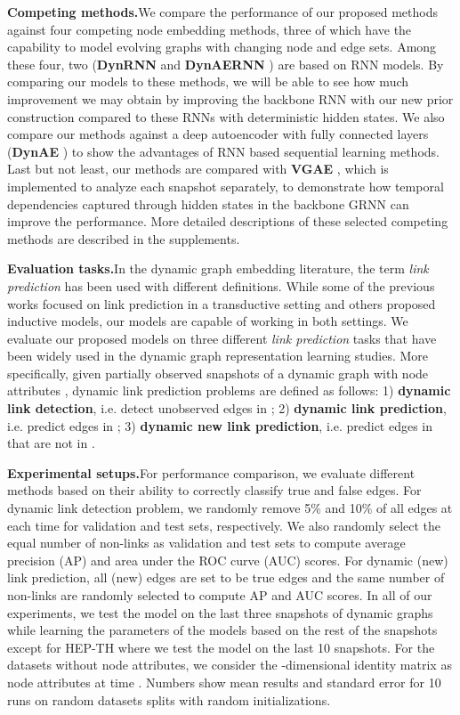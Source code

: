 \documentclass{article}
\begin{document}
\noindent\textbf{Competing methods.}\quad We compare the performance of our proposed methods against four competing node embedding methods, three of which have the capability to model evolving graphs with changing node and edge sets. 
Among these four, two (\textbf{DynRNN} and \textbf{DynAERNN} \citep{goyal2018dyngraph2vec}) are based on RNN models.
By comparing our models to these methods, we will be able to see how much improvement we may obtain by improving the backbone RNN with our new prior construction compared to these RNNs with deterministic hidden states. We also compare our methods against a deep autoencoder
with fully connected layers (\textbf{DynAE} \cite{goyal2018dyngraph2vec}) to show the advantages of RNN based sequential learning methods. Last but not least, our methods are compared with \textbf{VGAE} \cite{kipf2016variational}, which is implemented to analyze each snapshot separately, to demonstrate how temporal dependencies captured through hidden states in the backbone GRNN can improve the performance.
More detailed descriptions of these selected competing methods are described in the supplements.

\noindent\textbf{Evaluation tasks.}\quad In the dynamic graph embedding literature, the term \textit{link prediction} has been used with different definitions. While some of the previous works focused on link prediction in a transductive setting and others proposed inductive models, our models are capable of working in both settings. We evaluate our proposed models on three different \textit{link prediction} tasks that have been widely used in the dynamic graph representation learning studies. 
More specifically, given partially observed snapshots of a dynamic graph  with node attributes , dynamic link prediction problems are defined as follows: 1) \textbf{dynamic link detection}, i.e. detect unobserved edges in ; 2) \textbf{dynamic link prediction}, i.e. predict edges in ; 3) \textbf{dynamic new link prediction}, i.e. predict edges in  that are not in .

\noindent\textbf{Experimental setups.}\quad For performance comparison, we evaluate different methods based on their ability to correctly classify true and false edges. 
For dynamic link detection problem, we randomly remove 5\% and 10\% of all edges at each time for validation and test sets, respectively. We also randomly select the equal number of non-links as validation and test sets to compute average precision (AP) and area under the ROC curve (AUC) scores. 
For dynamic (new) link prediction, all (new) edges are set to be true edges and the same number of non-links are randomly selected to compute AP and AUC scores. 
In all of our experiments, we test the model on the last three snapshots of dynamic graphs while learning the parameters of the models based on the rest of the snapshots except for HEP-TH where we test the model on the last 10 snapshots.
For the datasets without node attributes, we consider the -dimensional identity matrix as node attributes at time . 
Numbers show mean results and standard error for 10 runs on random datasets splits with random initializations.
\end{document}
